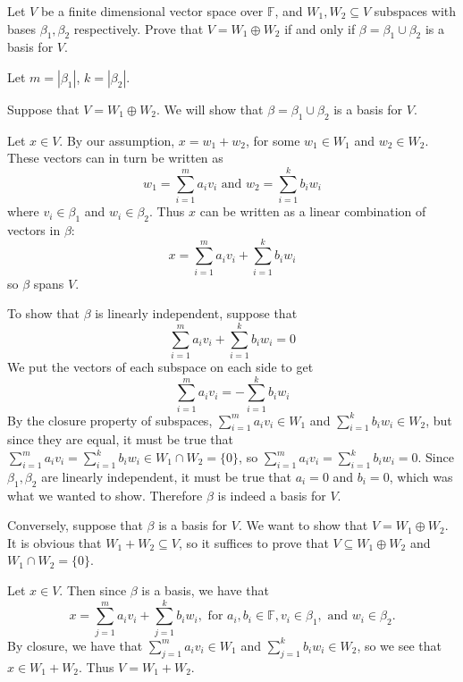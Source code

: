 \documentclass{article}
\theoremstyle{plain} %
\numberwithin{thm}{section} %
\theoremstyle{definition}
\begin{document}
    \begin{question}{9}
        Let \( V \) be a finite dimensional vector space over \( \mathbb{F} \), and \( W_1, W_2 \subseteq V \) subspaces with bases \( \beta_1, \beta_2 \) respectively. Prove that \( V = W_1 \oplus W_2 \) if and only if \( \beta = \beta_1 \cup \beta_2 \) is a basis for \( V \).

        \tcblower

        Let \(m = |\beta_1|\), \(k = |\beta _2|\).

        Suppose that \(V = W_1 \oplus W_2\). We will show that \(\beta = \beta _1 \cup \beta _2\) is a basis for \(V\).

        Let \(x \in V\). By our assumption, \(x = w_1 + w_2\), for some \(w_1 \in W_1\) and \(w_2 \in W_2\). These vectors can in turn be written as
        \[
            w_1 = \sum_{i=1}^m a_i v_i \text{ and } w_2 = \sum_{i=1} ^k b_i w_i
        \]
        where \(v_i \in \beta _1\) and \(w_i \in \beta _2\). Thus \(x\) can be written as a linear combination of vectors in \(\beta\):
        \[
            x = \sum_{i=1}^m a_i v_i + \sum_{i=1} ^k b_i w_i
        \]
        so \(\beta\) spans \(V\).

        To show that \(\beta\) is linearly independent, suppose that
        \[
            \sum_{i=1}^{m} a_i v_i + \sum_{i=1}^{k} b_i w_i = 0
        \]
        We put the vectors of each subspace on each side to get
        \[
            \sum_{i=1}^{m} a_i v_i = - \sum_{i=1}^{k} b_i w_i
        \]
        By the closure property of subspaces, \(\sum_{i=1}^{m} a_i v_i \in W_1\) and \(\sum_{i=1}^{k} b_i w_i \in W_2\), but since they are equal, it must be true that \(\sum_{i=1}^{m} a_i v_i = \sum_{i=1}^{k} b_i w_i \in W_1 \cap W_2 = \{ 0 \}\), so \(\sum_{i=1}^{m} a_i v_i = \sum_{i=1}^{k} b_i w_i = 0\). Since \(\beta _1, \beta _2\) are linearly independent, it must be true that \(a_i = 0\) and \(b_i = 0\), which was what we wanted to show. Therefore \(\beta\) is indeed a basis for \(V\).

        Conversely, suppose that \(\beta\) is a basis for \(V\). We want to show that \(V = W_1 \oplus W_2\). It is obvious that \(W_1 + W_2 \subseteq V\), so it suffices to prove that \(V \subseteq W_1 \oplus W_2\) and \(W_1 \cap W_2 = \{ 0 \}\).

        Let \(x \in V\). Then since \(\beta\) is a basis, we have that
        \[
            x = \sum_{j=1}^{m} a_i v_i + \sum_{j=1}^{k} b_i w_i, \text{ for } a_i, b_i \in \mathbb{F}, v_i \in \beta _1, \text{ and } w_i \in \beta _2.
        \]
        By closure, we have that \(\sum_{j=1}^{m} a_i v_i \in W_1\) and \(\sum_{j=1}^{k} b_i w_i \in W_2\), so we see that \(x \in W_1 + W_2\). Thus \(V = W_1 + W_2\).


\end{question}
\end{document}

